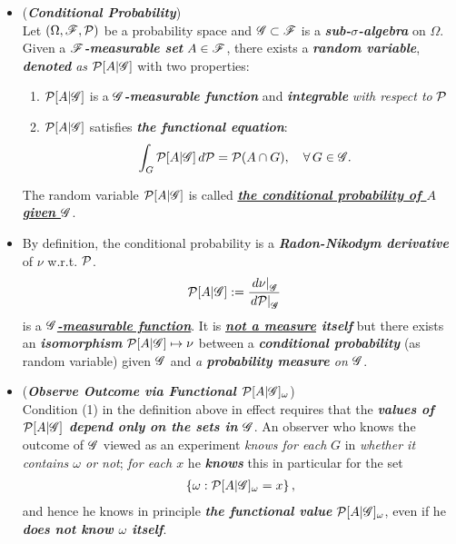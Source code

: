 \documentclass[11pt]{article}
\begin{document}
\begin{itemize}
\item \begin{definition} (\emph{\textbf{Conditional Probability}})\\
Let  $(\Omega,  {\mathscr F},  {\mathcal P})$ be a probability space and ${\mathscr G} \subset {\mathscr F}$ is a \emph{\textbf{sub-$\sigma$-algebra}} on $\Omega$. Given a \emph{\textbf{${\mathscr F}$-measurable set}} $A \in {\mathscr F}$,  there exists a \emph{\textbf{random variable}}, \emph{\textbf{denoted} as ${\mathcal P}[A | {\mathscr G}]$} with two properties:
\begin{enumerate}
\item ${\mathcal P}[A | {\mathscr G}]$ is a \emph{\textbf{${\mathscr G}$-measurable function}} and \emph{\textbf{integrable}} \emph{with respect to} ${\mathcal P}$
\item ${\mathcal P}[A | {\mathscr G}]$ satisfies \emph{\textbf{the functional equation}}:
\begin{align*}
 \int_{G} {\mathcal P}[A | {\mathscr G}] \,d{\mathcal P} &= {\mathcal P}(A \cap G), \quad \forall\, G \in {\mathscr G}.
\end{align*}
\end{enumerate}
The random variable ${\mathcal P}[A | {\mathscr G}]$ is called \underline{\emph{\textbf{the conditional probability of $A$ given ${\mathscr G}$}}}.
\end{definition}

\item \begin{remark}
By definition, the conditional probability is a \emph{\textbf{Radon-Nikodym derivative}} of $\nu$ w.r.t. ${\mathcal P}$.
\begin{align*}
{\mathcal P}[A | {\mathscr G}] &:= \frac{\left.{d\nu}\right\vert_{{\mathscr G}}}{\left.{d{\mathcal P}}\right\vert_{{\mathscr G}}}
\end{align*}
 is a \underline{\emph{\textbf{${\mathscr G}$-measurable function}}}. It is \emph{\textbf{\underline{not a measure} itself}} but there exists an \emph{\textbf{isomorphism}} ${\mathcal P}[A | {\mathscr G}] \mapsto \nu$ between a \emph{\textbf{conditional probability}} (as random variable) given ${\mathscr G}$ and \emph{a \textbf{probability measure} on ${\mathscr G}$}. 
\end{remark}


\item \begin{remark} (\emph{\textbf{Observe Outcome via Functional ${\mathcal P}[A | {\mathscr G}]_{\omega}$}})\\
Condition (1) in the definition above in effect requires that the \emph{\textbf{values of ${\mathcal P}[A | {\mathscr G}]$ depend only on the sets in ${\mathscr G}$}}. An observer who knows the outcome of ${\mathscr G}$ viewed as an experiment \emph{knows for each} $G$ in \emph{whether it contains $\omega$ or not}; \emph{for each $x$} he \emph{\textbf{knows}} this in particular for the set 
\begin{align*}
\left\{\omega: {\mathcal P}[A | {\mathscr G}]_{\omega} = x\right\},
\end{align*}
and hence he knows in principle \emph{\textbf{the functional value}} ${\mathcal P}[A | {\mathscr G}]_{\omega}$, even if he \emph{\textbf{does not know $\omega$ itself}}.
\end{remark}


\end{itemize}
\end{document}
